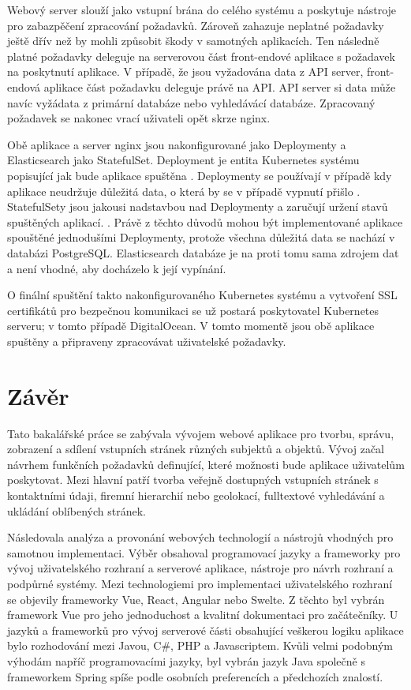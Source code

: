 		Webový server slouží jako vstupní brána do celého systému a poskytuje nástroje pro zabazpěčení
		zpracování požadavků.
		Zároveň zahazuje neplatné požadavky ještě dřív než by mohli způsobit škody v samotných aplikacích.
		Ten následně platné požadavky deleguje na serverovou část front-endové aplikace s požadavek na poskytnutí aplikace.
		V případě, že jsou vyžadována data z API server, front-endová aplikace část požadavku deleguje právě na \ac{API}.
		\ac{API} server si data může navíc vyžádata z primární databáze nebo vyhledávácí databáze.
		Zpracovaný požadavek se nakonec vrací uživateli opět skrze nginx.

		Obě aplikace a server nginx jsou nakonfigurované jako Deploymenty a Elasticsearch jako StatefulSet.
		Deployment je entita Kubernetes systému popisující jak bude aplikace spuštěna \cite{deployements}.
		Deploymenty se používají v případě kdy aplikace neudržuje důležitá data, o která by se v případě vypnutí přišlo
		\cite{deployements}.
		StatefulSety jsou jakousi nadstavbou nad Deploymenty a zaručují uržení stavů spuštěných aplikací. \cite{statefulsets}.
		Právě z těchto důvodů mohou být implementované aplikace spouštěné jednodušími Deploymenty, protože všechna důležitá
		data se nachází v databázi PostgreSQL.
		Elasticsearch databáze je na proti tomu sama zdrojem dat a není vhodné, aby docházelo k její vypínání.

		O finální spuštění takto nakonfigurovaného Kubernetes systému a vytvoření SSL certifikátů pro bezpečnou komunikaci
		se už postará poskytovatel Kubernetes serveru; v tomto případě DigitalOcean.
		V tomto momentě jsou obě aplikace spuštěny a připraveny zpracovávat uživatelské požadavky.

\section{Závěr}

Tato bakalářské práce se zabývala vývojem webové aplikace pro tvorbu, správu, zobrazení a sdílení vstupních stránek
různých subjektů a objektů.
Vývoj začal návrhem funkčních požadavků definující, které možnosti bude aplikace uživatelům poskytovat.
Mezi hlavní patří tvorba veřejně dostupných vstupních stránek s kontaktními údaji, firemní hierarchií nebo geolokací,
fulltextové vyhledávání a ukládání oblíbených stránek.

Následovala analýza a provonání webových technologií a nástrojů vhodných pro samotnou implementaci.
Výběr obsahoval programovací jazyky a frameworky pro vývoj uživatelského rozhraní a serverové aplikace, nástroje pro návrh
rozhraní a podpůrné systémy.
Mezi technologiemi pro implementaci uživatelského rozhraní se objevily frameworky Vue, React, Angular nebo Swelte.
Z těchto byl vybrán framework Vue pro jeho jednoduchost a kvalitní dokumentaci pro začátečníky.
U jazyků a frameworků pro vývoj serverové části obsahující veškerou logiku aplikace bylo rozhodování mezi Javou,
C\#, PHP a Javascriptem.
Kvůli velmi podobným výhodám napříč programovacími jazyky, byl vybrán jazyk Java společně s frameworkem Spring spíše podle
osobních preferencích a předchozích znalostí.

